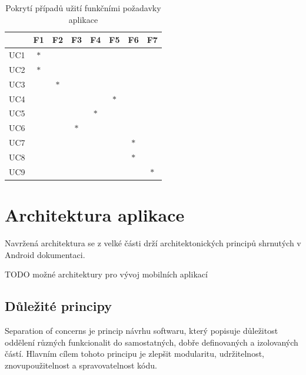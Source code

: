 \begin{table}[H]
  \centering
  \begin{tabular}{|l|c|c|c|c|c|c|c|}
  \hline
       & F1     & F2     & F3     & F4     & F5     & F6     & F7  \\ \hline
  UC1  & $\ast$ &        &        &        &        &        &         \\ \hline
  UC2  & $\ast$ &        &        &        &        &        &         \\ \hline
  UC3  &        & $\ast$ &        &        &        &        &         \\ \hline
  UC4  &        &        &        &        & $\ast$ &        &         \\ \hline
  UC5  &        &        &        & $\ast$ &        &        &         \\ \hline
  UC6  &        &        & $\ast$ &        &        &        &         \\ \hline
  UC7  &        &        &        &        &        & $\ast$ &         \\ \hline
  UC8  &        &        &        &        &        & $\ast$ &         \\ \hline
  UC9  &        &        &        &        &        &        &  $\ast$ \\ \hline
  \end{tabular}
  \caption{Pokrytí případů užití funkčními požadavky aplikace}
  \label{table:tabulkaPokryti}
\end{table}
  

\section{Architektura aplikace}
Navržená architektura se z velké části drží architektonických principů shrnutých v Android dokumentaci. \cite{andDocArch}

TODO možné architektury pro vývoj mobilních aplikací

\subsection*{Důležité principy}

Separation of concerns je princip návrhu softwaru, který popisuje důležitost oddělení různých funkcionalit do samostatných, dobře definovaných a izolovaných částí.
Hlavním cílem tohoto principu je zlepšit modularitu, udržitelnost, znovupoužitelnost a spravovatelnost kódu.

